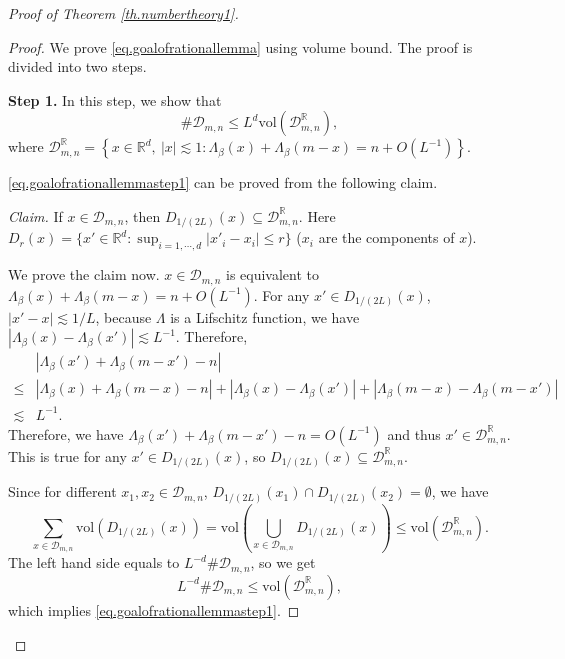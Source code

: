 \begin{proof}[Proof of Theorem \ref{th.numbertheory1}]
\begin{proof}
We prove \eqref{eq.goalofrationallemma} using volume bound. The proof is divided into two steps.

\textbf{Step 1.} In this step, we show that 
\begin{equation}\label{eq.goalofrationallemmastep1}
    \#\mathcal{D}_{m,n}\le L^{d} \text{vol}(\mathcal{D}^{\mathbb{R}}_{m,n}),
\end{equation}
where $\mathcal{D}^{\mathbb{R}}_{m,n}=\left\{x\in \mathbb{R}^d,\ |x|\lesssim 1:\Lambda_{\beta}(x)+\Lambda_{\beta}(m-x)=n+O(L^{-1})\right\}$.

\eqref{eq.goalofrationallemmastep1} can be proved from the following claim.

\textit{Claim.} If $x\in \mathcal{D}_{m,n}$, then $D_{1/(2L)}(x)\subseteq \mathcal{D}^{\mathbb{R}}_{m,n}$. Here  $D_{r}(x)=\{x'\in \mathbb{R}^d: \sup_{i=1,\cdots, d} |x'_i-x_i|\le r\}$ ($x_i$ are the components of $x$). 

We prove the claim now. $x\in \mathcal{D}_{m,n}$ is equivalent to $\Lambda_{\beta}(x)+\Lambda_{\beta}(m-x)=n+O(L^{-1})$. For any $x'\in D_{1/(2L)}(x)$, $|x'-x|\lesssim 1/L$, because $\Lambda$ is a Lifschitz function, we have $|\Lambda_{\beta}(x)-\Lambda_{\beta}(x')|\lesssim L^{-1}$. Therefore, 
\begin{equation}
\begin{split}
    &|\Lambda_{\beta}(x')+\Lambda_{\beta}(m-x')-n|
    \\
    \le &|\Lambda_{\beta}(x)+\Lambda_{\beta}(m-x)-n|+|\Lambda_{\beta}(x)-\Lambda_{\beta}(x')|+|\Lambda_{\beta}(m-x)-\Lambda_{\beta}(m-x')|
    \\
    \lesssim & L^{-1}.
\end{split}
\end{equation}
Therefore, we have $\Lambda_{\beta}(x')+\Lambda_{\beta}(m-x')-n=O(L^{-1})$ and thus $x'\in \mathcal{D}^{\mathbb{R}}_{m,n}$. This is true for any $x'\in D_{1/(2L)}(x)$, so $D_{1/(2L)}(x)\subseteq \mathcal{D}^{\mathbb{R}}_{m,n}$.

Since for different $x_1,x_2\in \mathcal{D}_{m,n}$, $D_{1/(2L)}(x_1)\cap D_{1/(2L)}(x_2)=\emptyset$, we have 
\begin{equation}
    \sum_{x\in \mathcal{D}_{m,n}} \text{vol}( D_{1/(2L)}(x))=\text{vol}\left( \bigcup_{x\in \mathcal{D}_{m,n}} D_{1/(2L)}(x)\right)\le \text{vol}(\mathcal{D}^{\mathbb{R}}_{m,n}).
\end{equation}
The left hand side equals to $L^{-d}\#\mathcal{D}_{m,n}$, so we get
\begin{equation}
    L^{-d}\#\mathcal{D}_{m,n}\le \text{vol}(\mathcal{D}^{\mathbb{R}}_{m,n}),
\end{equation}
which implies \eqref{eq.goalofrationallemmastep1}.


\end{proof}
\end{proof}
